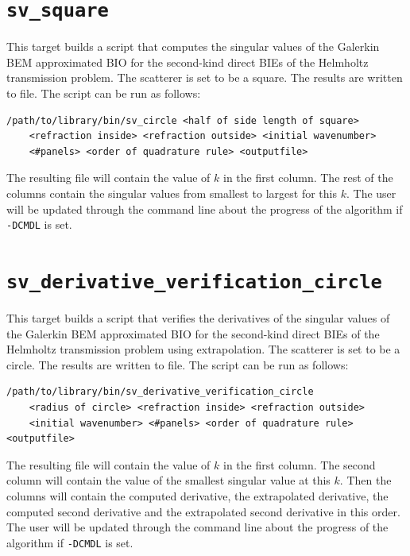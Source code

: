 \documentclass[a4paper, oneside]{thirdparty_stylesheets/discothesis}
\begin{document}
\cprotect\section{\verb|sv_square|}
This target builds a script that computes the singular values
of the Galerkin BEM approximated BIO for the
second-kind direct BIEs of the Helmholtz
transmission problem.
The scatterer is set to be a square.
The results are written to file.
The script can be run as follows:
\begin{verbatim}
/path/to/library/bin/sv_circle <half of side length of square> 
	<refraction inside> <refraction outside> <initial wavenumber>
	<#panels> <order of quadrature rule> <outputfile>
\end{verbatim}
The resulting file will contain the value of $k$ in the first column.
The rest of the columns contain the singular values from smallest to largest for this $k$.
The user will be updated through the command line about the progress of the algorithm if \verb|-DCMDL| is set.


\cprotect\section{\verb|sv_derivative_verification_circle|}
This target builds a script that verifies the derivatives of the singular
values of the Galerkin BEM approximated BIO for the
second-kind direct BIEs of the Helmholtz transmission problem
using extrapolation.
The scatterer is set to be a circle.
The results are written to file.
The script can be run as follows:
\begin{verbatim}
/path/to/library/bin/sv_derivative_verification_circle 
	<radius of circle> <refraction inside> <refraction outside> 
	<initial wavenumber> <#panels> <order of quadrature rule> <outputfile>
\end{verbatim}
The resulting file will contain the value of $k$ in the first column.
The second column will contain the value of the smallest singular value at this $k$.
Then the columns will contain the computed derivative, the extrapolated derivative, the computed second derivative and the extrapolated second derivative in this order.
The user will be updated through the command line about the progress of the algorithm if \verb|-DCMDL| is set.
\end{document}
